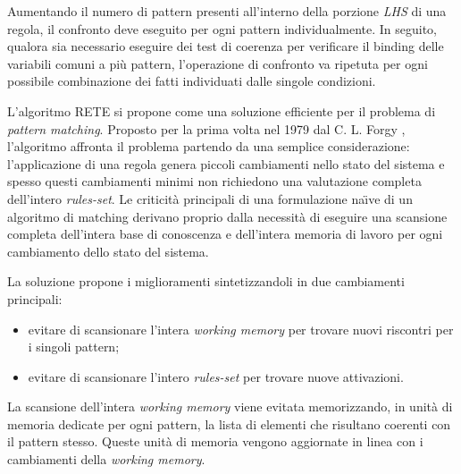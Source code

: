 Aumentando il numero di pattern presenti all'interno della porzione \emph{LHS} di una regola, il confronto deve eseguito per ogni pattern individualmente. In seguito, qualora sia necessario eseguire dei test di coerenza per verificare il binding delle variabili comuni a più pattern, l'operazione di confronto va ripetuta per ogni possibile combinazione dei fatti individuati dalle singole condizioni.

L'algoritmo RETE si propone come una soluzione efficiente per il problema di \emph{pattern matching}. Proposto per la prima volta nel 1979 dal C. L. Forgy \cite{forgy1979} \cite{forgy1982}, l'algoritmo affronta il problema partendo da una semplice considerazione: l'applicazione di una regola genera piccoli cambiamenti nello stato del sistema e spesso questi cambiamenti minimi non richiedono una valutazione completa dell'intero \emph{rules-set}. Le criticità principali di una formulazione na\"{\i}ve di un algoritmo di matching derivano proprio dalla necessità di eseguire una scansione completa dell'intera base di conoscenza e dell'intera memoria di lavoro per ogni cambiamento dello stato del sistema.

La soluzione propone i miglioramenti sintetizzandoli in due cambiamenti principali:
\begin{itemize}
	\item evitare di scansionare l'intera \emph{working memory} per trovare nuovi riscontri per i singoli pattern;
	\item evitare di scansionare l'intero \emph{rules-set} per trovare nuove attivazioni.
\end{itemize}

La scansione dell'intera \emph{working memory} viene evitata memorizzando, in unità di memoria dedicate per ogni pattern, la lista di elementi che risultano coerenti con il pattern stesso. Queste unità di memoria vengono aggiornate in linea con i cambiamenti della \emph{working memory}.

